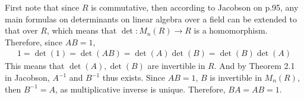 \documentclass[12pt]{article}
\begin{document}
\begin{fproof}[Jacobson 2.3.2]
    First note that since \(R\) is commutative, then according to Jacobson on p.95, any main formulas on determinants on linear algebra over a field can be extended to that over \(R\), which means that \(\det: M_n(R) \to R\) is a homomorphism.
    Therefore, since \(AB = 1\), 
    \begin{align*}
        1 = \det(1)= \det(AB) = \det(A) \det(B) = \det(B)\det(A)
    \end{align*}
    This means that \(\det(A), \det(B)\) are invertible in \(R\).
    And by Theorem 2.1 in Jacobson,
    \(A^{-1}\) and \(B^{-1}\) thus exists.
    Since \(AB = 1\), \(B\) is invertible in \(M_n(R)\), then \(B^{-1} = A\), as multiplicative inverse is unique.
    Therefore, \(BA = AB = 1\).
\end{fproof}
\newpage

\begin{fproof}[Jacobson 2.4.5]

\end{fproof}
\newpage

\begin{fproof}[Jacobson 2.5.2]
  
\end{fproof}
\newpage

\begin{fproof}[Jacobson 2.5.3]

\end{fproof}
\newpage

\begin{fproof}[Jacobson 2.6.4]

\end{fproof}
\newpage

\begin{fproof}[Jacobson 2.7.2]

\end{fproof}
\newpage

\begin{fproof}[Jacobson 2.7.4]

\end{fproof}
\newpage

\begin{fproof}[Jacobson 2.7.9]

\end{fproof}
\newpage

\begin{fproof}[Jacobson 2.7.10]

\end{fproof}
\end{document}

